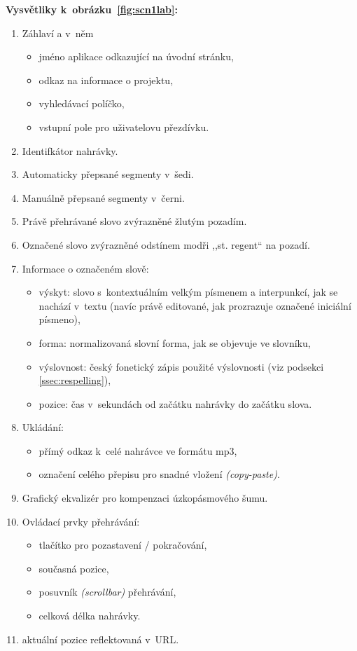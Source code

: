 \textbf{Vysvětliky k~obrázku~\ref{fig:scn1lab}:}
\begin{enumerate}
\item{
    Záhlaví a v~něm
    \begin{itemize}
    \item{jméno aplikace odkazující na úvodní stránku,}
    \item{odkaz na informace o projektu,}
    \item{vyhledávací políčko,}
    \item{vstupní pole pro uživatelovu přezdívku.}
    \end{itemize}
}
\item{Identifkátor nahrávky.}
\item{Automaticky přepsané segmenty v~šedi.}
\item{Manuálně přepsané segmenty v~černi.}
\item{Právě přehrávané slovo zvýrazněné žlutým pozadím.}
\item{Označené slovo zvýrazněné odstínem modři ,,st. regent`` na pozadí.}
\item{
    Informace o označeném slově:
    \begin{itemize}
    \item{
        výskyt: slovo s~kontextuálním velkým písmenem a
        interpunkcí, jak se nachází v~textu
        (navíc právě editované, jak prozrazuje označené iniciální písmeno),
    }
    \item{forma: normalizovaná slovní forma, jak se objevuje ve slovníku,}
    \item{
        výslovnost: český fonetický zápis použité výslovnosti (viz podsekci
        \ref{ssec:respelling}),
    }
    \item{
        pozice: čas v~sekundách od začátku nahrávky do začátku slova.
    }
    \end{itemize}
}
\item{
    Ukládání:
    \begin{itemize}
    \item{přímý odkaz k~celé nahrávce ve formátu mp3,}
    \item{označení celého přepisu pro snadné vložení {\em (copy-paste)}.}
    \end{itemize}
}
\item{Grafický ekvalizér pro kompenzaci úzkopásmového šumu.}
\item{
    Ovládací prvky přehrávání:
    \begin{itemize}
    \item{tlačítko pro pozastavení / pokračování,}
    \item{současná pozice,}
    \item{posuvník {\em (scrollbar)} přehrávání,}
    \item{celková délka nahrávky.}
    \end{itemize}
}
\item{aktuální pozice reflektovaná v~URL.}
\end{enumerate}

